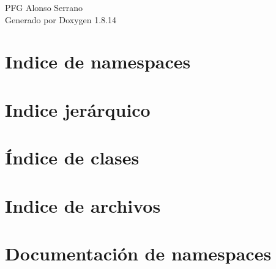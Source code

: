 \documentclass[twoside]{book}
\newcommand{\+}{\discretionary{\mbox{\scriptsize$\hookleftarrow$}}{}{}}
\newcommand{\clearemptydoublepage}{%
  \newpage{\pagestyle{empty}\cleardoublepage}%
}
\begin{document}
\hypersetup{pageanchor=false,
             bookmarksnumbered=true,
             pdfencoding=unicode
            }
\begin{titlepage}
\vspace*{7cm}
\begin{center}%
{\Large P\+FG Alonso Serrano }\\
\vspace*{1cm}
{\large Generado por Doxygen 1.8.14}\\
\end{center}
\end{titlepage}
\clearemptydoublepage
{}
\tableofcontents
\clearemptydoublepage
{}
\hypersetup{pageanchor=true}

\chapter{Indice de namespaces}

\chapter{Indice jerárquico}

\chapter{Índice de clases}

\chapter{Indice de archivos}

\chapter{Documentación de namespaces}












\end{document}
